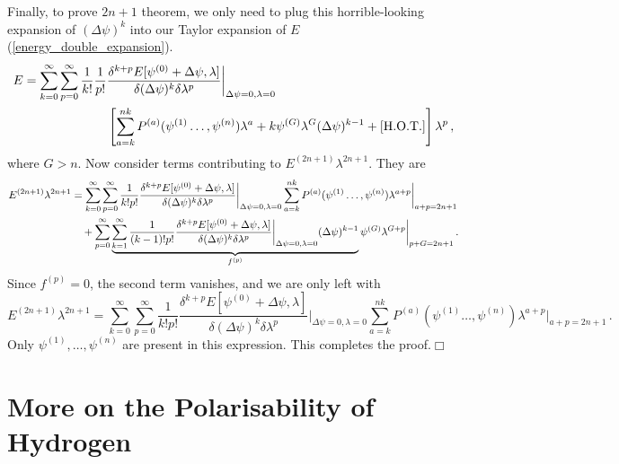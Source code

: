 \documentclass{article}
\theoremstyle{plain}\theoremheaderfont{\normalfont\itshape}\theorembodyfont{\rmfamily}\theoremseparator{.}\newtheorem*{rem}{Remark}\newtheorem*{ex}{Example}\newtheorem*{proof}{Proof}\newtheorem*{altp}{Alternative proof}
\theoremstyle{plain}\theoremheaderfont{\normalfont\bfseries}\theorembodyfont{\rmfamily}\theoremseparator{.}\newtheorem{thm}{Theorem}[section]\newtheorem{lem}[thm]{Lemma}\newtheorem{prop}[thm]{Proposition}\newtheorem*{cor}{Corollary}\newtheorem{defn}[thm]{Definition}\newtheorem{clm}[thm]{Claim}\newtheorem{clminproof}{Claim}
\theoremstyle{break}\theoremheaderfont{\normalfont\itshape}\theorembodyfont{\rmfamily}\theoremseparator{.\medskip}\newtheorem*{proofskip}{Proof}\newtheorem*{exs}{Examples}\newtheorem*{rems}{Remarks}
\theoremstyle{break}\theoremheaderfont{\normalfont\bfseries}\theorembodyfont{\rmfamily}\theoremseparator{.\medskip}\newtheorem{lemskip}[thm]{Lemma}\newtheorem{defnskip}[thm]{Definition}\newtheorem{propskip}[thm]{Proposition}\newtheorem{thmskip}[thm]{Theorem}
\numberwithin{equation}{section}
\newcommand{\qed}{\hfill\ensuremath{\Box}}
\begin{document}
    Finally, to prove \(2n+1\) theorem, we only need to plug this horrible-looking expansion of \((\Delta\psi)^k\) into our Taylor expansion of \(E\) (\ref{energy_double_expansion}).
    \begin{align}
        E=\sum_{k=0}^{\infty}\sum_{p=0}^{\infty}\frac{1}{k!}\frac{1}{p!}&\frac{\delta^{k+p}E[\psi^{(0)}+\Delta\psi,\lambda]}{\delta(\Delta\psi)^k\delta\lambda^p}\bigg|_{\Delta\psi=0,\lambda=0}\notag\\
        &\left[\sum_{a=k}^{nk}P^{(a)}(\psi^{(1)}\dots,\psi^{(n)})\lambda^a + k\psi^{(G)}\lambda^{G}(\Delta\psi)^{k-1}+[\text{H.O.T.}]\right]\lambda^p\,,
    \end{align}
    where \(G>n\). Now consider terms contributing to \(E^{(2n+1)}\lambda^{2n+1}\). They are
    \begin{align}
        E^{(2n+1)}\lambda^{2n+1}&=\sum_{k=0}^{\infty}\sum_{p=0}^{\infty}\frac{1}{k!p!}\frac{\delta^{k+p}E[\psi^{(0)}+\Delta\psi,\lambda]}{\delta(\Delta\psi)^k\delta\lambda^p}\bigg|_{\Delta\psi=0,\lambda=0}\sum_{a=k}^{nk}P^{(a)}(\psi^{(1)}\dots,\psi^{(n)})\lambda^{a+p}\bigg|_{a+p=2n+1}\notag\\
        &\quad+\sum_{p=0}^{\infty}\underbrace{\sum_{k=1}^{\infty}\frac{1}{(k-1)!p!}\frac{\delta^{k+p}E[\psi^{(0)}+\Delta\psi,\lambda]}{\delta(\Delta\psi)^k\delta\lambda^p}\bigg|_{\Delta\psi=0,\lambda=0}(\Delta\psi)^{k-1}}_{f^{(p)}}\psi^{(G)}\lambda^{G+p}\bigg|_{p+G=2n+1}\,.
    \end{align}
    Since \(f^{(p)}=0\), the second term vanishes, and we are only left with
    \begin{equation}
        E^{(2n+1)}\lambda^{2n+1}=\sum_{k=0}^{\infty}\sum_{p=0}^{\infty}\frac{1}{k!p!}\frac{\delta^{k+p}E[\psi^{(0)}+\Delta\psi,\lambda]}{\delta(\Delta\psi)^k\delta\lambda^p}\bigg|_{\Delta\psi=0,\lambda=0}\sum_{a=k}^{nk}P^{(a)}(\psi^{(1)}\dots,\psi^{(n)})\lambda^{a+p}\bigg|_{a+p=2n+1}\,.
    \end{equation}
    Only \(\psi^{(1)},\dots,\psi^{(n)}\) are present in this expression. This completes the proof.\qed

    \section{More on the Polarisability of Hydrogen}\label{Chap:Hydrogen_Polarisability}
\end{document}
